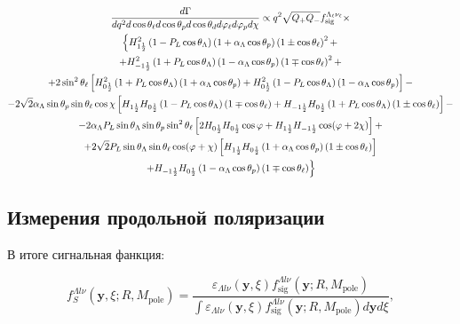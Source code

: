 \begin{multline}
    \frac{d\Gamma}{dq^2 d\cos\theta_\ell d\cos\theta_p d\cos\theta_d d\varphi_\ell d\varphi_p d\chi} \propto q^2 \sqrt{Q_+ Q_-} f^{\Lambda_\ell \nu_\ell}_{\text{sig}} \times \\
    \left\{ H_{1\frac{1}{2}}^2 \left( 1 - P_L \cos\theta_\Lambda \right) \left( 1 + \alpha_\Lambda \cos\theta_p \right) \left( 1 \pm \cos\theta_\ell \right)^2 + \right. \\
    + H_{-1\frac{1}{2}}^2 \left( 1 + P_L \cos\theta_\Lambda \right) \left( 1 - \alpha_\Lambda \cos\theta_p \right) \left( 1 \mp \cos\theta_\ell \right)^2 +\\
    + 2 \sin^2\theta_\ell \left[ H_{0\frac{1}{2}}^2 \left( 1 + P_L \cos\theta_\Lambda \right) \left( 1 + \alpha_\Lambda \cos\theta_p \right) + H_{0\frac{1}{2}}^2 \left( 1 - P_L \cos\theta_\Lambda \right) \left( 1 - \alpha_\Lambda \cos\theta_p \right) \right] - \\
    - 2\sqrt{2} \alpha_\Lambda \sin\theta_p \sin\theta_\ell \cos\chi \left[ H_{1\frac{1}{2}} H_{0\frac{1}{2}} \left( 1 - P_L \cos\theta_\Lambda \right) \left( 1 \mp \cos\theta_\ell \right) + H_{-1\frac{1}{2}} H_{0\frac{1}{2}} \left( 1 + P_L \cos\theta_\Lambda \right) \left( 1 \pm \cos\theta_\ell \right) \right] -\\
    - 2\alpha_\Lambda P_L \sin\theta_\Lambda \sin\theta_p \sin^2\theta_\ell \left[ 2H_{0\frac{1}{2}} H_{0\frac{1}{2}} \cos\varphi + H_{1\frac{1}{2}} H_{-1\frac{1}{2}} \cos(\varphi + 2\chi) \right] +\\
    + 2\sqrt{2} P_L \sin\theta_\Lambda \sin\theta_\ell \cos(\varphi + \chi) \left[ H_{1\frac{1}{2}} H_{0\frac{1}{2}} \left( 1 + \alpha_\Lambda \cos\theta_p \right) \left( 1 \pm \cos\theta_\ell \right) \right] \\
    \left.+ H_{-1\frac{1}{2}} H_{0\frac{1}{2}} \left( 1 - \alpha_\Lambda \cos\theta_p \right) \left( 1 \mp \cos\theta_\ell \right) \right\}
\end{multline}

\subsection{Измерения продольной поляризации}

В итоге сигнальная фанкция:

\begin{equation}
    f_{S}^{\Lambda l \nu} (\mathbf{y}, \xi; R, M_{\text{pole}}) = \frac{\varepsilon_{\Lambda l \nu} (\mathbf{y}, \xi) f_{\text{sig}}^{\Lambda l \nu} (\mathbf{y}; R, M_{\text{pole}})}{\int \varepsilon_{\Lambda l \nu} (\mathbf{y}, \xi) f_{\text{sig}}^{\Lambda l \nu} (\mathbf{y}; R, M_{\text{pole}}) d\mathbf{y} d\xi},
\end{equation}

